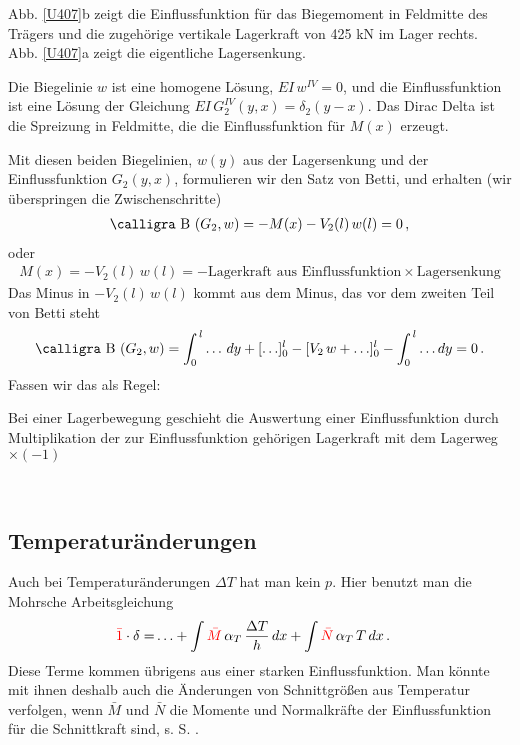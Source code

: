 Abb. \ref{U407}b zeigt die Einflussfunktion f\"{u}r das Biegemoment in Feldmitte des Tr\"{a}gers und die zugeh\"{o}rige vertikale Lagerkraft von 425 kN im Lager rechts. Abb. \ref{U407}a zeigt die eigentliche Lagersenkung.

Die Biegelinie $w$ ist eine homogene L\"{o}sung, $EI\,w^{IV} = 0$, und die Einflussfunktion ist eine L\"{o}sung der Gleichung $EI\,G_2^{IV}(y,x) = \delta_2(y-x)$. Das Dirac Delta ist die Spreizung in Feldmitte, die die Einflussfunktion f\"{u}r $M(x)$ erzeugt.

Mit diesen beiden Biegelinien, $w(y)$ aus der Lagersenkung und der Einflussfunktion $G_2(y,x)$, formulieren wir den Satz von Betti, und erhalten (wir \"{u}berspringen die Zwischenschritte)
\begin{align}
\text{\normalfont\calligra B\,\,}(G_2,w) = - M(x) - V_2(l)\,w(l) = 0\,,
\end{align}
oder
\begin{align}
M(x) = - V_2(l)\,w(l) = -\text{Lagerkraft aus Einflussfunktion} \times \text{Lagersenkung}
\end{align}
Das Minus in $- V_2(l)\,w(l) $ kommt aus dem Minus, das vor dem zweiten Teil von Betti steht
\begin{align}
\text{\normalfont\calligra B\,\,}(G_2,w) = \int_0^{\,l} \ldots\,dy + [\ldots]_0^l - [V_2\,w + \ldots]_0^l  - \int_0^{\,l} \ldots dy = 0\,.
\end{align}
Fassen wir das als Regel:\\

\hspace*{-12pt}\colorbox{highlightBlue}{\parbox{0.98\textwidth}{Bei einer Lagerbewegung geschieht die Auswertung einer Einflussfunktion durch Multiplikation der zur Einflussfunktion geh\"{o}rigen Lagerkraft mit dem Lagerweg $\times (-1)$}}\\

{\textcolor{sectionTitleBlue}{\subsection{Temperatur\"{a}nderungen}}}\label{Korrektur39}
Auch bei Temperatur\"{a}nderungen $\Delta T$ hat man kein $p$. Hier benutzt man die Mohrsche Arbeitsgleichung
\begin{align}\label{Eq131}
    \textcolor{red}{\bar{1}} \cdot \delta
    = &\ldots  + \int \textcolor{red}{\bar{M}}\,\alpha_T\,\frac{\Delta T}{h}\,dx + \int \textcolor{red}{\bar{N}}\,\alpha_T\,T\,dx\,.
\end{align}
Diese Terme kommen \"{u}brigens aus einer starken Einflussfunktion. Man k\"{o}nnte mit ihnen deshalb auch die \"{A}nderungen von Schnittgr\"{o}{\ss}en aus Temperatur verfolgen, wenn $\bar{M}$ und $\bar{N}$ die Momente und Normalkr\"{a}fte der Einflussfunktion f\"{u}r die Schnittkraft sind, s. S. \pageref{TempIdentit}.

